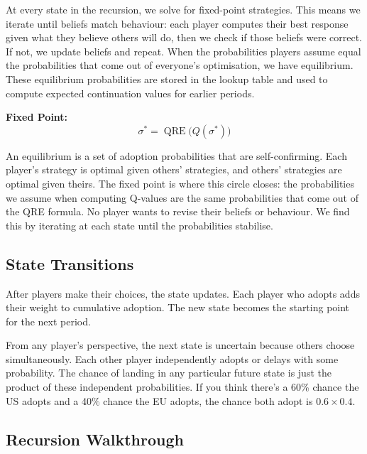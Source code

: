 \documentclass[12pt,a4paper]{article}
\begin{document}
At every state in the recursion, we solve for fixed-point strategies. This means we iterate until beliefs match behaviour: each player computes their best response given what they believe others will do, then we check if those beliefs were correct. If not, we update beliefs and repeat. When the probabilities players assume equal the probabilities that come out of everyone's optimisation, we have equilibrium. These equilibrium probabilities are stored in the lookup table and used to compute expected continuation values for earlier periods.

\noindent\textbf{Fixed Point:}
\[
  \sigma^* = \operatorname{QRE}\!\bigl(Q(\sigma^*)\bigr)
\]

An equilibrium is a set of adoption probabilities that are self-confirming. Each player's strategy is optimal given others' strategies, and others' strategies are optimal given theirs. The fixed point is where this circle closes: the probabilities we assume when computing Q-values are the same probabilities that come out of the QRE formula. No player wants to revise their beliefs or behaviour. We find this by iterating at each state until the probabilities stabilise.

\subsection{State Transitions}

After players make their choices, the state updates. Each player who adopts adds their weight to cumulative adoption. The new state becomes the starting point for the next period.

From any player's perspective, the next state is uncertain because others choose simultaneously. Each other player independently adopts or delays with some probability. The chance of landing in any particular future state is just the product of these independent probabilities. If you think there's a 60\% chance the US adopts and a 40\% chance the EU adopts, the chance both adopt is $0.6 \times 0.4$.

\subsection{Recursion Walkthrough}
\end{document}
